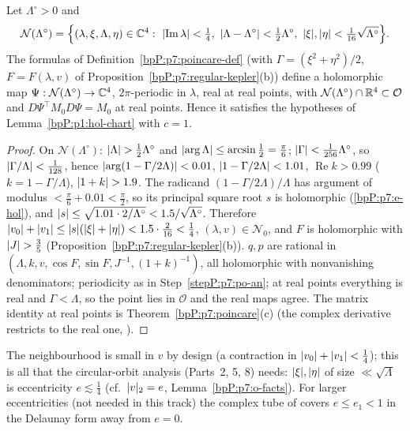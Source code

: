 \begin{proposition}\label{bpP:p7:holomorphic}
Let $\Lambda^\circ>0$ and
\[\mathcal N(\Lambda^\circ)=\Bigl\{(\lambda,\xi,\Lambda,\eta)\in\C^4:\ \abs{\operatorname{Im}\lambda}<\tfrac14,\ \abs{\Lambda-\Lambda^\circ}<\tfrac12\Lambda^\circ,\ \abs\xi,\abs\eta<\tfrac1{16}\sqrt{\Lambda^\circ}\Bigr\}.\]
The formulas of Definition~\ref{bpP:p7:poincare-def} (with $\Gamma=(\xi^2+\eta^2)/2$, $F=F(\lambda,v)$ of Proposition~\ref{bpP:p7:regular-kepler}(b)) define a holomorphic map $\Psi:\mathcal N(\Lambda^\circ)\to\mathbb{C}^4$, $2\pi$-periodic in $\lambda$, real at real points, with $\mathcal N(\Lambda^\circ)\cap\mathbb{R}^4\subset\mathcal O$ and $D\Psi^{\top}M_0D\Psi=M_0$ at real points. Hence it satisfies the hypotheses of Lemma~\ref{bpP:p1:hol-chart} with $c=1$.
\end{proposition}
\begin{proof}
\label{stepP:p7:ho-size} On $\mathcal N(\Lambda^\circ)$: $\lvert \Lambda\rvert>\frac12\Lambda^\circ$ and $\lvert \arg\Lambda\rvert\le\arcsin\frac12=\frac\pi6$; $\lvert \Gamma\rvert<\frac1{256}\Lambda^\circ$, so $\lvert \Gamma/\Lambda\rvert<\frac1{128}$, hence $\lvert \arg(1-\Gamma/2\Lambda)\rvert<0.01$, $\lvert 1-\Gamma/2\Lambda\rvert<1.01$, $\operatorname{Re}k>0.99$ ($k=1-\Gamma/\Lambda$), $\lvert 1+k\rvert>1.9$. The radicand $(1-\Gamma/2\Lambda)/\Lambda$ has argument of modulus $<\frac\pi6+0.01<\frac\pi2$, so its principal square root $s$ is holomorphic (\ref{bpP:p7:e-hol}), and $\lvert s\rvert\le\sqrt{1.01\cdot2/\Lambda^\circ}<1.5/\sqrt{\Lambda^\circ}$. Therefore $\lvert v_0\rvert+\lvert v_1\rvert\le\lvert s\rvert(\lvert \xi\rvert+\lvert \eta\rvert)<1.5\cdot\frac2{16}<\frac14$, $(\lambda,v)\in\mathcal N_0$, and $F$ is holomorphic with $\lvert J\rvert>\frac35$ (Proposition~\ref{bpP:p7:regular-kepler}(b)).
\label{stepP:p7:ho-hol} $q,p$ are rational in $(\Lambda,k,v,\cos F,\sin F,J^{-1},(1+k)^{-1})$, all holomorphic with nonvanishing denominators; periodicity as in Step~\ref{stepP:p7:po-an}; at real points everything is real and $\Gamma<\Lambda$, so the point lies in $\mathcal O$ and the real maps agree. The matrix identity at real points is Theorem~\ref{bpP:p7:poincare}(c) (the complex derivative restricts to the real one, ).
\end{proof}
\begin{remark}\label{bpP:p7:ho-rem}
The neighbourhood is small in $v$ by design (a contraction in $\lvert v_0\rvert+\lvert v_1\rvert<\frac14$); this is all that the circular-orbit analysis (Parts~2, 5, 8) needs: $\lvert \xi\rvert,\lvert \eta\rvert$ of size $\ll\sqrt\Lambda$ is eccentricity $e\lesssim\frac14$ (cf.\ $\lvert v\rvert_2=e$, Lemma~\ref{bpP:p7:o-facts}). For larger eccentricities (not needed in this track) the complex tube of  covers $e\le e_1<1$ in the Delaunay form away from $e=0$.
\end{remark}

